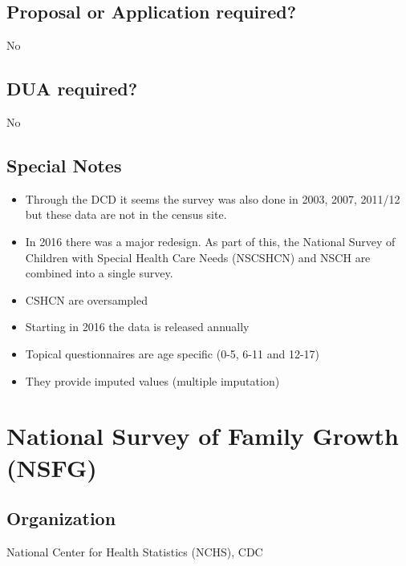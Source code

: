 \documentclass[
]{book}
\providecommand{\tightlist}{%
  \setlength{\itemsep}{0pt}\setlength{\parskip}{0pt}}
\begin{document}
\hypertarget{proposal-or-application-required-61}{%
\section{Proposal or Application required?}\label{proposal-or-application-required-61}}

No

\hypertarget{dua-required-61}{%
\section{DUA required?}\label{dua-required-61}}

No

\hypertarget{special-notes-61}{%
\section{Special Notes}\label{special-notes-61}}

\begin{itemize}
\tightlist
\item
  Through the DCD it seems the survey was also done in 2003, 2007, 2011/12 but these data are not in the census site.
\item
  In 2016 there was a major redesign. As part of this, the National Survey of Children with Special Health Care Needs (NSCSHCN) and NSCH are combined into a single survey.
\item
  CSHCN are oversampled
\item
  Starting in 2016 the data is released annually
\item
  Topical questionnaires are age specific (0-5, 6-11 and 12-17)
\item
  They provide imputed values (multiple imputation)
\end{itemize}

\mainmatter

\hypertarget{national-survey-of-family-growth-nsfg}{%
\chapter{National Survey of Family Growth (NSFG)}\label{national-survey-of-family-growth-nsfg}}

\hypertarget{organization-62}{%
\section{Organization}\label{organization-62}}

National Center for Health Statistics (NCHS), CDC
\end{document}
